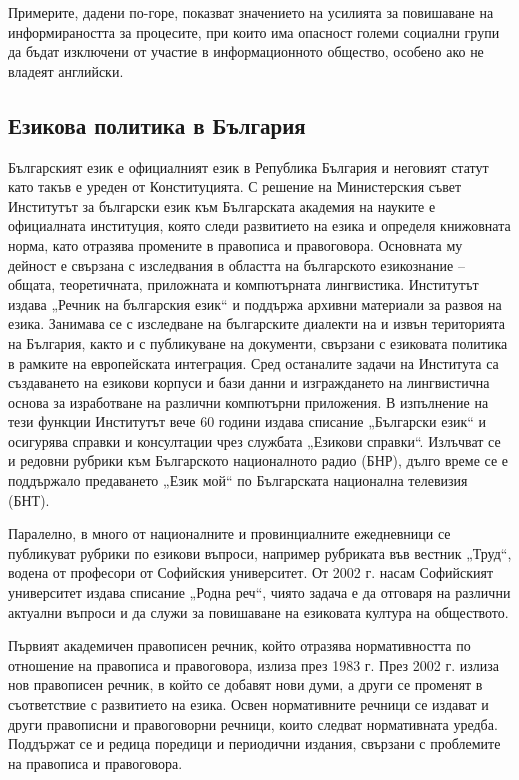 \documentclass[]{../../metanetpaper}
\begin{document}
\begin{multicols}{2}
Примерите, дадени по-горе, показват значението на усилията за повишаване на информираността за процесите, при които има опасност големи социални
 групи
 да
 бъдат
 изключени
 от
 участие
 в
 информационното общество, особено ако не владеят
 английски.

\subsection{Езикова политика в България}


Българският език е официалният език в Република България и неговият статут като такъв е уреден от Конституцията. С
 решение на Министерския съвет Институтът за български език към Българската академия на науките е
 официалната институция, която следи развитието на
 езика и определя книжовната норма, като отразява промените в правописа и правоговора. Основната му дейност е свързана с изследвания в областта на българското езикознание – общата, теоретичната, приложната и компютърната лингвистика. Институтът издава „Речник на българския език“ и поддържа архивни
 материали за развоя на езика. Занимава се с изследване
 на българските диалекти на и извън територията на
 България, както и с публикуване на документи, свързани
 с езиковата политика в рамките на европейската
 интеграция. Сред останалите задачи на Института са
 създаването на езикови корпуси и бази данни и
 изграждането на лингвистична основа за изработване на
 различни компютърни приложения. В изпълнение на
 тези функции Институтът вече 60 години издава
 списание „Български език“ и
 осигурява справки и консултации чрез службата
 „Езикови справки“. Излъчват се и редовни рубрики към
 Българското националното радио (БНР), дълго време се е поддържало предаването „Език
 мой“ по Българската национална телевизия (БНТ).
 
Паралелно, в много от националните и провинциалните ежедневници се публикуват рубрики по езикови въпроси,
 например рубриката във вестник „Труд“, водена от
 професори от Софийския университет. От 2002 г. насам
 Софийският университет издава списание „Родна реч“,
 чиято задача е да отговаря на различни актуални
 въпроси и да служи за повишаване на езиковата култура на
 обществото.

Първият академичен правописен речник,
 който отразява нормативността по отношение на
 правописа и правоговора, излиза през 1983 г. През 2002
 г. излиза нов правописен речник, в който се добавят
 нови думи, а други се променят в съответствие с
 развитието на езика.
 Освен нормативните речници се издават и други
 правописни и правоговорни речници, които следват
 нормативната уредба. Поддържат се и редица поредици и периодични издания,
 свързани с проблемите на правописа и правоговора.


\end{multicols}
\end{document}
